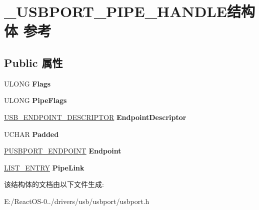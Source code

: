 \hypertarget{struct___u_s_b_p_o_r_t___p_i_p_e___h_a_n_d_l_e}{}\section{\+\_\+\+U\+S\+B\+P\+O\+R\+T\+\_\+\+P\+I\+P\+E\+\_\+\+H\+A\+N\+D\+L\+E结构体 参考}
\label{struct___u_s_b_p_o_r_t___p_i_p_e___h_a_n_d_l_e}
\subsection*{Public 属性}
\begin{DoxyCompactItemize}
\item 
\mbox{\label{struct___u_s_b_p_o_r_t___p_i_p_e___h_a_n_d_l_e_adc2ba72d05e3ff318bc8cc3496e6e526}} 
U\+L\+O\+NG {\bfseries Flags}
\item 
\mbox{\label{struct___u_s_b_p_o_r_t___p_i_p_e___h_a_n_d_l_e_a5760cd6ce38e2bdd4fc1285d3398bf71}} 
U\+L\+O\+NG {\bfseries Pipe\+Flags}
\item 
\mbox{\label{struct___u_s_b_p_o_r_t___p_i_p_e___h_a_n_d_l_e_a17a8ad3701079765af6d44b03bd8c8f3}} 
\hyperlink{struct___u_s_b___e_n_d_p_o_i_n_t___d_e_s_c_r_i_p_t_o_r}{U\+S\+B\+\_\+\+E\+N\+D\+P\+O\+I\+N\+T\+\_\+\+D\+E\+S\+C\+R\+I\+P\+T\+OR} {\bfseries Endpoint\+Descriptor}
\item 
\mbox{\label{struct___u_s_b_p_o_r_t___p_i_p_e___h_a_n_d_l_e_aa15a8650710f34d4209ac2724e91ac90}} 
U\+C\+H\+AR {\bfseries Padded}
\item 
\mbox{\label{struct___u_s_b_p_o_r_t___p_i_p_e___h_a_n_d_l_e_a2c8db1ed44ab078ae3a2a648abe4c157}} 
\hyperlink{struct___u_s_b_p_o_r_t___e_n_d_p_o_i_n_t}{P\+U\+S\+B\+P\+O\+R\+T\+\_\+\+E\+N\+D\+P\+O\+I\+NT} {\bfseries Endpoint}
\item 
\mbox{\label{struct___u_s_b_p_o_r_t___p_i_p_e___h_a_n_d_l_e_ad1abaf4a45095dc3de2999a93ae0b07e}} 
\hyperlink{struct___l_i_s_t___e_n_t_r_y}{L\+I\+S\+T\+\_\+\+E\+N\+T\+RY} {\bfseries Pipe\+Link}
\end{DoxyCompactItemize}


该结构体的文档由以下文件生成\+:\begin{DoxyCompactItemize}
\item 
E\+:/\+React\+O\+S-\/0../drivers/usb/usbport/usbport.\+h\end{DoxyCompactItemize}
